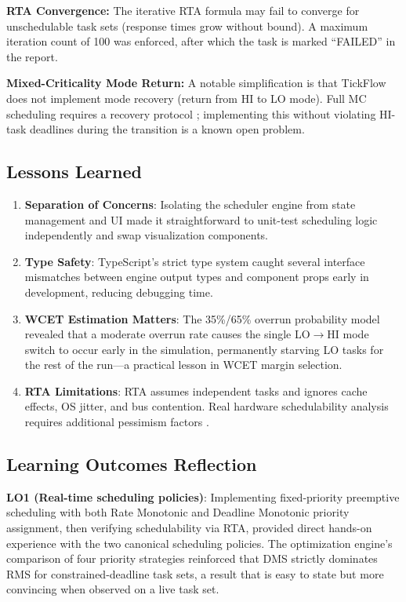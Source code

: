 \documentclass[conference]{IEEEtran}
\begin{document}
\textbf{RTA Convergence:} The iterative RTA formula may fail to converge for unschedulable task sets (response times grow without bound). A maximum iteration count of 100 was enforced, after which the task is marked ``FAILED'' in the report.

\textbf{Mixed-Criticality Mode Return:} A notable simplification is that TickFlow does not implement mode recovery (return from HI to LO mode). Full MC scheduling requires a recovery protocol \cite{baruah2011mixed}; implementing this without violating HI-task deadlines during the transition is a known open problem.

\subsection{Lessons Learned}

\begin{enumerate}
  \item \textbf{Separation of Concerns}: Isolating the scheduler engine from state management and UI made it straightforward to unit-test scheduling logic independently and swap visualization components.
  \item \textbf{Type Safety}: TypeScript's strict type system caught several interface mismatches between engine output types and component props early in development, reducing debugging time.
  \item \textbf{WCET Estimation Matters}: The 35\%/65\% overrun probability model revealed that a moderate overrun rate causes the single LO$\rightarrow$HI mode switch to occur early in the simulation, permanently starving LO tasks for the rest of the run---a practical lesson in WCET margin selection.
  \item \textbf{RTA Limitations}: RTA assumes independent tasks and ignores cache effects, OS jitter, and bus contention. Real hardware schedulability analysis requires additional pessimism factors \cite{wilhelm2008worst}.
\end{enumerate}

\subsection{Learning Outcomes Reflection}

\textbf{LO1 (Real-time scheduling policies)}: Implementing fixed-priority preemptive scheduling with both Rate Monotonic and Deadline Monotonic priority assignment, then verifying schedulability via RTA, provided direct hands-on experience with the two canonical scheduling policies. The optimization engine's comparison of four priority strategies reinforced that DMS strictly dominates RMS for constrained-deadline task sets, a result that is easy to state but more convincing when observed on a live task set.
\end{document}
